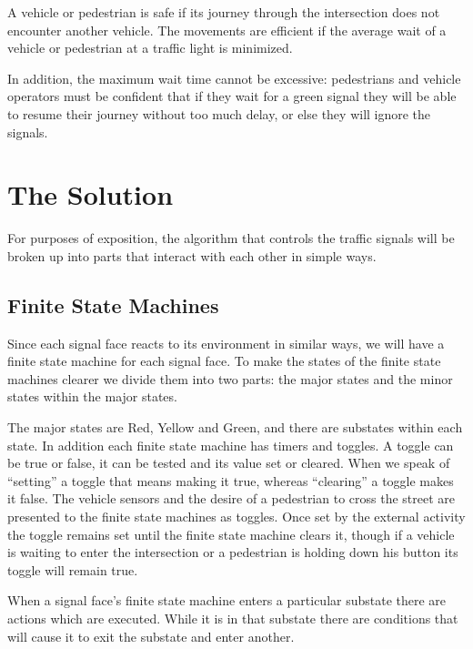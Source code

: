\documentclass[letterpaper,twoside]{article}
\begin{document}
A vehicle or pedestrian is safe if its journey through the intersection
does not encounter another vehicle.  The movements are efficient if the
average wait of a vehicle or pedestrian at a traffic light is minimized.

In addition, the maximum wait time cannot be excessive: pedestrians and
vehicle operators must be confident that if they wait for a green signal
they will be able to resume their journey without too much delay, or
else they will ignore the signals.

\section{The Solution}
For purposes of exposition, the algorithm that controls the traffic
signals will be broken up into parts that interact with each other
in simple ways.

\subsection{Finite State Machines}
Since each signal face reacts to its environment in similar ways,
we will have a finite state machine for each signal face.
To make the states of the finite state machines clearer we divide them into
two parts: the major states and the minor states within the major states.

The major states are Red,
Yellow and Green, and there are substates within each state.  In addition
each finite state machine has timers and toggles.
A toggle can be true or false,
it can be tested and its value set or cleared.
When we speak of ``setting'' a toggle
that means making it true, whereas ``clearing'' a toggle makes it false.
The vehicle sensors and the desire of a pedestrian
to cross the street are presented to the finite state machines as toggles.
Once set by
the external activity the toggle remains set until the finite state machine
clears it, though if a vehicle is waiting to enter the
intersection or a pedestrian is holding down his button its toggle will
remain true.

When a signal face's finite state machine enters a particular substate
there are actions
which are executed.  While it is in that substate there are conditions
that will cause it to exit the substate and enter another.
\end{document}
